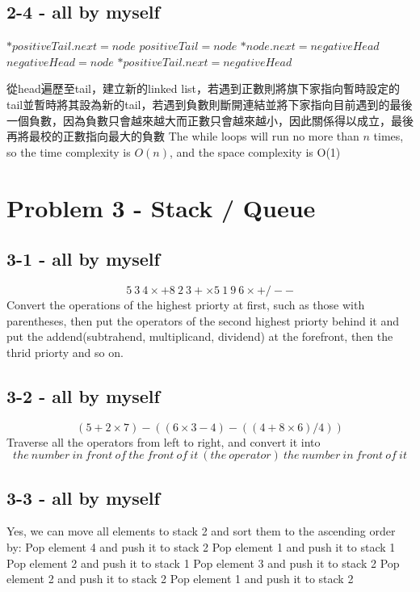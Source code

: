 \documentclass[12pt]{article}
\begin{document}
\newpage
\subsection*{2-4 - all by myself}
\begin{algorithmic}
    \State $*positiveTail.next = node$
    \State $positiveTail = node$
    \Else
    \State $*node.next = negativeHead$
    \State $negativeHead = node$
    \EndIf
    \EndWhile
    \State $*positiveTail.next = negativeHead$
    \EndProcedure
\end{algorithmic}
從head遍歷至tail，建立新的linked list，若遇到正數則將旗下家指向暫時設定的tail並暫時將其設為新的tail，若遇到負數則斷開連結並將下家指向目前遇到的最後一個負數，因為負數只會越來越大而正數只會越來越小，因此關係得以成立，最後再將最校的正數指向最大的負數\newline
The while loops will run no more than $n$ times, so the time complexity is $O(n)$, and the space complexity is O(1)

\newpage
\section*{Problem 3 - Stack / Queue}
\subsection*{3-1 - all by myself}
\[5\ 3\ 4\times+8\ 2\ 3+\times5\ 1\ 9\ 6\times+/--\]
Convert the operations of the highest priorty at first, such as those with parentheses, then put the operators of the second highest priorty behind it and put the addend(subtrahend, multiplicand, dividend) at the forefront, then the thrid priorty and so on.

\subsection*{3-2 - all by myself}
\[(5+2\times7)-((6\times3-4)-((4+8\times6)/4))\]
Traverse all the operators from left to right, and convert it into
\[the\ number\ in\ front\ of\ the\ front\ of\ it\  (the\ operator)\   the\ number\ in\ front\ of\ it\]

\subsection*{3-3 - all by myself}
Yes, we can move all elements to stack 2 and sort them to the ascending order by:\newline
\newline
Pop element 4 and push it to stack 2\newline
Pop element 1 and push it to stack 1\newline
Pop element 2 and push it to stack 1\newline
Pop element 3 and push it to stack 2\newline
Pop element 2 and push it to stack 2\newline
Pop element 1 and push it to stack 2\newline
\end{document}

